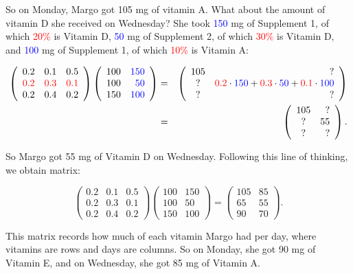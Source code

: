 \begin{example}
So on Monday, Margo got 105 mg of vitamin A.  What about the amount of vitamin D she received on Wednesday?  She took \textcolor{blue}{150} mg of Supplement 1, of which \textcolor{red}{20\%} is Vitamin D, \textcolor{blue}{50} mg of Supplement 2, of which \textcolor{red}{30\%} is Vitamin D, and \textcolor{blue}{100} mg of Supplement 1, of which \textcolor{red}{10\%} is Vitamin A:

\begin{eqnarray*}
\left( \begin{array}{rrr}
0.2 & 0.1 & 0.5\\
\textcolor{red}{0.2} & \textcolor{red}{0.3} & \textcolor{red}{0.1}\\
0.2 & 0.4 & 0.2
\end{array}\right)\left( \begin{array}{rrr}
100 & \textcolor{blue}{150}\\
100 & \textcolor{blue}{50}\\
150 & \textcolor{blue}{100}
\end{array}\right)&=&\left( \begin{array}{cr}
105 & ? \\
? & \textcolor{red}{0.2}\cdot\textcolor{blue}{150}+\textcolor{red}{0.3}\cdot\textcolor{blue}{50}+\textcolor{red}{0.1}\cdot\textcolor{blue}{100} \\
? & ? 
\end{array}\right)\\
&=&\left( \begin{array}{cr}
105 & ? \\
? & 55 \\
? & ? 
\end{array}\right).
\end{eqnarray*}

So Margo got 55 mg of Vitamin D on Wednesday.  Following this line of thinking, we obtain matrix:

$$\left( \begin{array}{rrr}
{0.2} & {0.1} & {0.5}\\
0.2 & 0.3 & 0.1\\
0.2 & 0.4 & 0.2
\end{array}\right)\left( \begin{array}{rrr}
{100} & 150\\
{100} & 50\\
{150} & 100
\end{array}\right)=\left( \begin{array}{cr}
105 & 85 \\
65 & 55 \\
90 & 70 
\end{array}\right).$$

This matrix records how much of each vitamin Margo had per day, where vitamins are rows and days are columns.  So on Monday, she got 90 mg of Vitamin E, and on Wednesday, she got 85 mg of Vitamin A.

\end{example}

